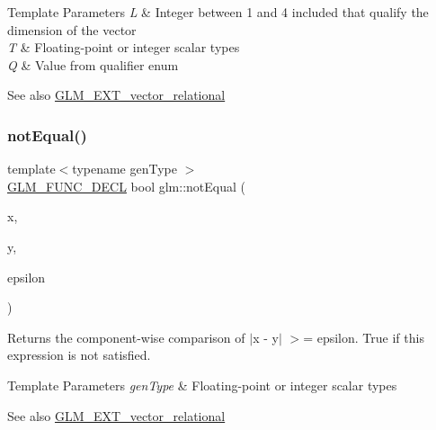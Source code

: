 \begin{DoxyTemplParams}{Template Parameters}
{\em L} & Integer between 1 and 4 included that qualify the dimension of the vector \\
\hline
{\em T} & Floating-\/point or integer scalar types \\
\hline
{\em Q} & Value from qualifier enum\\
\hline
\end{DoxyTemplParams}
\begin{DoxySeeAlso}{See also}
\hyperlink{group__ext__vector__relational}{G\+L\+M\+\_\+\+E\+X\+T\+\_\+vector\+\_\+relational} 
\end{DoxySeeAlso}
\mbox{\label{group__ext__vector__relational_ga27c5118811bcfed5504e50f22693373e}} 
\subsubsection{\texorpdfstring{not\+Equal()}{notEqual()}\hspace{0.1cm}{\footnotesize\ttfamily [3/3]}}
{\footnotesize\ttfamily template$<$typename gen\+Type $>$ \\
\hyperlink{setup_8hpp_ab2d052de21a70539923e9bcbf6e83a51}{G\+L\+M\+\_\+\+F\+U\+N\+C\+\_\+\+D\+E\+CL} bool glm\+::not\+Equal (\begin{DoxyParamCaption}\item[{gen\+Type const \&}]{x,  }\item[{gen\+Type const \&}]{y,  }\item[{gen\+Type const \&}]{epsilon }\end{DoxyParamCaption})}

Returns the component-\/wise comparison of $\vert$x -\/ y$\vert$ $>$= epsilon. True if this expression is not satisfied.


\begin{DoxyTemplParams}{Template Parameters}
{\em gen\+Type} & Floating-\/point or integer scalar types\\
\hline
\end{DoxyTemplParams}
\begin{DoxySeeAlso}{See also}
\hyperlink{group__ext__vector__relational}{G\+L\+M\+\_\+\+E\+X\+T\+\_\+vector\+\_\+relational} 
\end{DoxySeeAlso}
